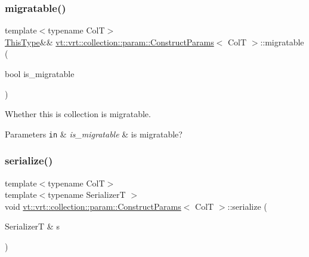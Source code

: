\subsubsection{\texorpdfstring{migratable()}{migratable()}}
{\footnotesize\ttfamily template$<$typename ColT$>$ \\
\hyperlink{structvt_1_1vrt_1_1collection_1_1param_1_1_construct_params_a13d4910c0f6825c7b0ddfebce5288bea}{This\+Type}\&\& \hyperlink{structvt_1_1vrt_1_1collection_1_1param_1_1_construct_params}{vt\+::vrt\+::collection\+::param\+::\+Construct\+Params}$<$ ColT $>$\+::migratable (\begin{DoxyParamCaption}\item[{bool}]{is\+\_\+migratable }\end{DoxyParamCaption})\hspace{0.3cm}{\ttfamily [inline]}}



Whether this is collection is migratable. 


\begin{DoxyParams}[1]{Parameters}
\mbox{\tt in}  & {\em is\+\_\+migratable} & is migratable? \\
\hline
\end{DoxyParams}
\mbox{\label{structvt_1_1vrt_1_1collection_1_1param_1_1_construct_params_a315a60ef3b90e398f68a8abf02561b05}} 
\subsubsection{\texorpdfstring{serialize()}{serialize()}}
{\footnotesize\ttfamily template$<$typename ColT$>$ \\
template$<$typename SerializerT $>$ \\
void \hyperlink{structvt_1_1vrt_1_1collection_1_1param_1_1_construct_params}{vt\+::vrt\+::collection\+::param\+::\+Construct\+Params}$<$ ColT $>$\+::serialize (\begin{DoxyParamCaption}\item[{SerializerT \&}]{s }\end{DoxyParamCaption})\hspace{0.3cm}{\ttfamily [inline]}}


